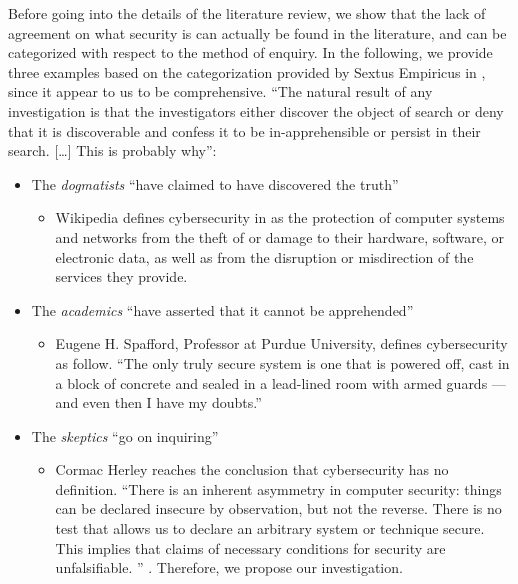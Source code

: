 Before going into the details of the literature review, we show that the lack
of agreement on what security is can actually be found in the literature, and
can be categorized with respect to the method of enquiry.  In the following, we
provide three examples based on the categorization provided by Sextus Empiricus
in \autocite{Empiricus1990Pyrrhonism}, since it appear to us to be
comprehensive. ``The natural result of any investigation is that the
investigators either discover the object of search or deny that it is
discoverable and confess it to be in-apprehensible or persist in their search.
[\ldots] This is probably why''\autocite{Empiricus1990Pyrrhonism}: 
\begin{itemize}
	\item The \emph{dogmatists} ``have claimed to have discovered the truth''
		\begin{itemize}
			\item Wikipedia defines cybersecurity in
				\autocite{wiki-cybersecurity} as the protection
				of computer systems and networks from the theft
				of or damage to their hardware, software, or
				electronic data, as well as from the disruption
				or misdirection of the services they provide.
		\end{itemize}
	\item The \emph{academics} ``have asserted that it cannot be apprehended''
		\begin{itemize}
			\item Eugene H. Spafford, Professor at Purdue
				University, defines cybersecurity as follow.
				``The only truly secure system is one that is
				powered off, cast in a block of concrete and
				sealed in a lead-lined room with armed guards —
				and even then I have my doubts.''
				\autocite{Spafford2019Quotes}
		\end{itemize}
	\item The \emph{skeptics} ``go on inquiring''
		\begin{itemize}
			\item Cormac Herley reaches the conclusion that
				cybersecurity has no definition. ``There is an
				inherent asymmetry in computer security: things
				can be declared insecure by observation, but
				not the reverse. There is no test that allows
				us to declare an arbitrary system or technique
				secure. This implies that claims of necessary
				conditions for security are unfalsifiable. ''
				\autocite{Herley2016unfalsifiability}. Therefore, we propose our investigation.
		\end{itemize}
\end{itemize}

